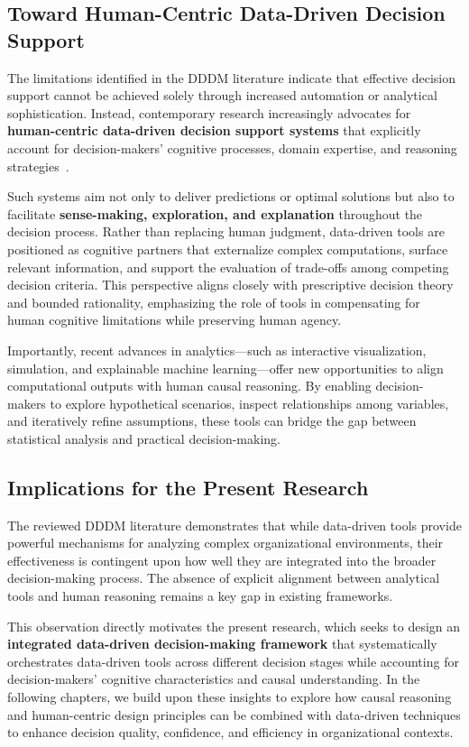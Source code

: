 \documentclass{sfuthesis}
\begin{document}
\subsection{Toward Human-Centric Data-Driven Decision Support}
The limitations identified in the DDDM literature indicate that effective decision support cannot be achieved solely through increased automation or analytical sophistication. Instead, contemporary research increasingly advocates for \textbf{human-centric data-driven decision support systems} that explicitly account for decision-makers’ cognitive processes, domain expertise, and reasoning strategies~\cite{brandas_data_2016,hayn_predictive_2018}.\par
Such systems aim not only to deliver predictions or optimal solutions but also to facilitate \textbf{sense-making, exploration, and explanation} throughout the decision process. Rather than replacing human judgment, data-driven tools are positioned as cognitive partners that externalize complex computations, surface relevant information, and support the evaluation of trade-offs among competing decision criteria. This perspective aligns closely with prescriptive decision theory and bounded rationality, emphasizing the role of tools in compensating for human cognitive limitations while preserving human agency.\par
Importantly, recent advances in analytics—such as interactive visualization, simulation, and explainable machine learning—offer new opportunities to align computational outputs with human causal reasoning. By enabling decision-makers to explore hypothetical scenarios, inspect relationships among variables, and iteratively refine assumptions, these tools can bridge the gap between statistical analysis and practical decision-making.
\subsection{Implications for the Present Research}
The reviewed DDDM literature demonstrates that while data-driven tools provide powerful mechanisms for analyzing complex organizational environments, their effectiveness is contingent upon how well they are integrated into the broader decision-making process. The absence of explicit alignment between analytical tools and human reasoning remains a key gap in existing frameworks.\par
This observation directly motivates the present research, which seeks to design an \textbf{integrated data-driven decision-making framework} that systematically orchestrates data-driven tools across different decision stages while accounting for decision-makers’ cognitive characteristics and causal understanding. In the following chapters, we build upon these insights to explore how causal reasoning and human-centric design principles can be combined with data-driven techniques to enhance decision quality, confidence, and efficiency in organizational contexts.
\end{document}
